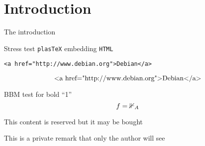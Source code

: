 \section*{Introduction}
The introduction

\begin{abstract}
  This simple \LaTeX\ tests some features
  of \texttt{plasTeX} and \texttt{ColDoc}.

  \ifetex Using  \TeX \fi ;
  \ifxetex Using \texttt{XeTeX} \fi ;
  \ifluatex Using \texttt{LuaTeX} \fi ;
  \iftutex Using \texttt{XeTeX} or \texttt{LuaTeX} \fi ;
  \ifplastex Using \texttt{plasTeX} \fi .

\end{abstract}

Stress test  \texttt{plasTeX} embedding \texttt{HTML}
\begin{verbatim}
<a href="http://www.debian.org">Debian</a>
\end{verbatim}
\[ \hbox{<a href="http://www.debian.org">Debian</a>} \]

BBM test for bold ``1''
\[f={\mathbbm{1}}_A\]

\begin{buyablecontent}
  This content is reserved but it may be bought
\end{buyablecontent}

\begin{privateremark}
  This is a private remark that only the author will see
\end{privateremark}
